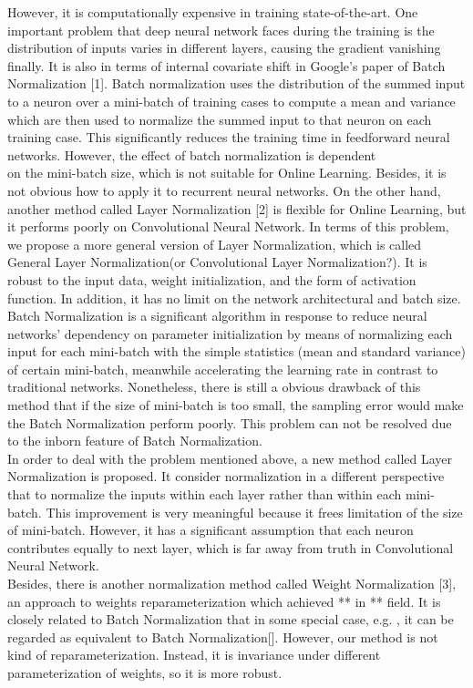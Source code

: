 \documentclass{sig-alternate}
\begin{document}
    However, it is computationally expensive in training state-of-the-art. One important problem that deep neural network faces during the training is the distribution of inputs varies in different layers, causing the gradient vanishing finally. It is also in terms of internal covariate shift in Google’s paper of Batch Normalization [1]. Batch normalization uses the distribution of the summed input to a neuron over a mini-batch of training cases to compute a mean and variance which are then used to normalize the summed input to that neuron on each training case. This significantly reduces the training time in feedforward neural networks. However, the effect of batch normalization is dependent\\
    on the mini-batch size, which is not suitable for Online Learning. Besides, it is not obvious how to apply it to recurrent neural networks. On the other hand, another method called Layer Normalization [2] is flexible for Online Learning, 
    but it performs poorly on Convolutional Neural Network. In terms of this problem, we propose a more general version of Layer Normalization, which is called General Layer Normalization(or Convolutional Layer Normalization?). It is robust to the input data, weight initialization, and the form of activation function. In addition, it has no limit on the network architectural and batch size.\\
    Batch Normalization is a significant algorithm in response to reduce neural networks’ dependency on parameter initialization by means of normalizing each input for each mini-batch with the simple statistics (mean and standard variance) of certain mini-batch, meanwhile accelerating the learning rate in contrast to traditional networks. Nonetheless, there is still a obvious drawback of this method that if the size of mini-batch is too small, the sampling error would make the Batch Normalization perform poorly. This problem can not be resolved due to the inborn feature of Batch Normalization.\\
    In order to deal with the problem mentioned above, a new method called Layer Normalization is proposed. It consider normalization in a different perspective that to normalize the inputs within each layer rather than within each mini-batch. This improvement is very meaningful because it frees limitation of the size of mini-batch. However, it has a significant assumption that each neuron contributes equally to next layer, which is far away from truth in Convolutional Neural Network.\\
    Besides, there is another normalization method called Weight Normalization [3], an approach to weights reparameterization which achieved ** in ** field. It is closely related to Batch Normalization that in some special case, e.g. , it can be regarded as equivalent to Batch Normalization[]. However, our method is not kind of reparameterization. Instead, it is invariance under different parameterization of weights, so it is more robust.\\
\end{document}
